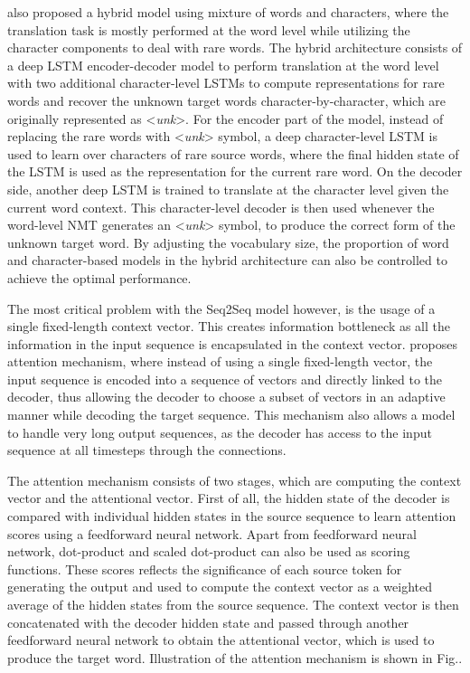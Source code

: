 \documentclass[12pt]{extarticle}
\begin{document}
\citep{luong-manning-2016-achieving} also proposed a hybrid model using mixture of words and characters, where the translation task is mostly performed at the word level while utilizing the character components to deal with rare words. The hybrid architecture consists of a deep LSTM encoder-decoder model to perform translation at the word level with two additional character-level LSTMs to compute representations for rare words and recover the unknown target words character-by-character, which are originally represented as \textless \textit{unk}\textgreater{}. For the encoder part of the model, instead of replacing the rare words with \textless \textit{unk}\textgreater{} symbol, a deep character-level LSTM is used to learn over characters of rare source words, where the final hidden state of the LSTM is used as the representation for the current rare word. On the decoder side, another deep LSTM is trained to translate at the character level given the current word context. This character-level decoder is then used whenever the word-level NMT generates an \textless \textit{unk}\textgreater{} symbol, to produce the correct form of the unknown target word. By adjusting the vocabulary size, the proportion of word and character-based models in the hybrid architecture can also be controlled to achieve the optimal performance.

The most critical problem with the Seq2Seq model however, is the usage of a single fixed-length context vector. This creates information bottleneck as all the information in the input sequence is encapsulated in the context vector. \citep{DBLP:journals/corr/BahdanauCB14} proposes attention mechanism, where instead of using a single fixed-length vector, the input sequence is encoded into a sequence of vectors and directly linked to the decoder, thus allowing the decoder to choose a subset of vectors in an adaptive manner while decoding the target sequence. This mechanism also allows a model to handle very long output sequences, as the decoder has access to the input sequence at all timesteps through the connections.

The attention mechanism consists of two stages, which are computing the context vector and the attentional vector. First of all, the hidden state of the decoder is compared with individual hidden states in the source sequence to learn attention scores using a feedforward neural network. Apart from feedforward neural network, dot-product \citep{luong-etal-2015-effective} and scaled dot-product \citep{NIPS2017_7181} can also be used as scoring functions. These scores reflects the significance of each source token for generating the output and used to compute the context vector as a weighted average of the hidden states from the source sequence. The context vector is then concatenated with the decoder hidden state and passed through another feedforward neural network to obtain the attentional vector, which is used to produce the target word. Illustration of the attention mechanism is shown in Fig..
\end{document}
